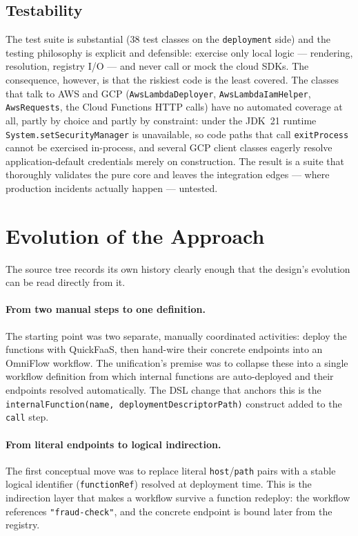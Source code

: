 \subsection{Testability}

The test suite is substantial (38 test classes on the \texttt{deployment} side) and the testing
philosophy is explicit and defensible: exercise only local logic --- rendering, resolution,
registry I/O --- and never call or mock the cloud SDKs. The consequence, however, is that the
riskiest code is the least covered. The classes that talk to AWS and GCP
(\texttt{AwsLambdaDeployer}, \texttt{AwsLambdaIamHelper}, \texttt{AwsRequests}, the Cloud
Functions HTTP calls) have no automated coverage at all, partly by choice and partly by
constraint: under the JDK~21 runtime \texttt{System.setSecurityManager} is unavailable, so code
paths that call \texttt{exitProcess} cannot be exercised in-process, and several GCP client
classes eagerly resolve application-default credentials merely on construction. The result is a
suite that thoroughly validates the pure core and leaves the integration edges --- where
production incidents actually happen --- untested.

\section{Evolution of the Approach}
\label{sec:evolution}

The source tree records its own history clearly enough that the design's evolution can be read
directly from it.

\paragraph{From two manual steps to one definition.}
The starting point was two separate, manually coordinated activities: deploy the functions with
QuickFaaS, then hand-wire their concrete endpoints into an OmniFlow workflow. The unification's
premise was to collapse these into a single workflow definition from which internal functions
are auto-deployed and their endpoints resolved automatically. The DSL change that anchors this
is the \texttt{internalFunction(name, deploymentDescriptorPath)} construct added to the
\texttt{call} step.

\paragraph{From literal endpoints to logical indirection.}
The first conceptual move was to replace literal \texttt{host}/\texttt{path} pairs with a stable
logical identifier (\texttt{functionRef}) resolved at deployment time. This is the indirection
layer that makes a workflow survive a function redeploy: the workflow references
\texttt{"fraud-check"}, and the concrete endpoint is bound later from the registry.

